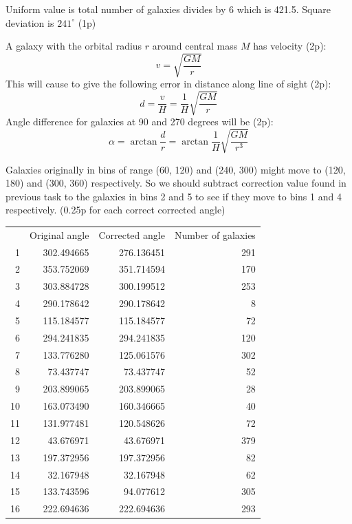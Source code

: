 \begin{description}
  Uniform value is total number of galaxies divides by 6 which is
  421.5. Square deviation is $241^\circ$ (1p)

\item[(b)] A galaxy with the orbital radius $r$ around central mass $M$
  has velocity (2p):
  \[ v = \sqrt{\frac{GM}{r}} \]
  This will cause to give the following error in distance along line of
  sight (2p):
  \[ d = \frac{v}{H} = \frac{1}{H}\sqrt{\frac{GM}{r}} \]
  Angle difference for galaxies at 90 and 270 degrees will be (2p):
  \[ \alpha = \arctan\frac{d}{r}
     = \arctan\frac{1}{H}\sqrt{\frac{GM}{r^3}} \]

\item[(c)] Galaxies originally in bins of range (60, 120) and (240, 300)
  might move to (120, 180) and (300, 360) respectively. So we should
  subtract correction value found in previous task to the galaxies in
  bins 2 and 5 to see if they move to bins 1 and 4 respectively. (0.25p
  for each correct corrected angle)

  \begin{center}
  \begin{tabular}{rrrr}
  & Original angle & Corrected angle & Number of galaxies\\
  1 & 302.494665 & 276.136451 & 291\\
  2 & 353.752069 & 351.714594 & 170\\
  3 & 303.884728 & 300.199512 & 253\\
  4 & 290.178642 & 290.178642 & 8\\
  5 & 115.184577 & 115.184577 & 72\\
  6 & 294.241835 & 294.241835 & 120\\
  7 & 133.776280 & 125.061576 & 302\\
  8 & 73.437747 & 73.437747 & 52\\
  9 & 203.899065 & 203.899065 & 28\\
  10 & 163.073490 & 160.346665 & 40\\
  11 & 131.977481 & 120.548626 & 72\\
  12 & 43.676971 & 43.676971 & 379\\
  13 & 197.372956 & 197.372956 & 82\\
  14 & 32.167948 & 32.167948 & 62\\
  15 & 133.743596 & 94.077612 & 305\\
  16 & 222.694636 & 222.694636 & 293
  \end{tabular}
  \end{center}


\end{description}

